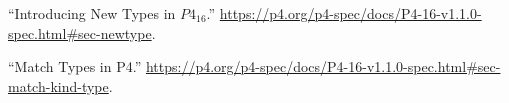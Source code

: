 \documentclass[11pt]{article}
\begin{document}
{{\begin{thebibliography}{36}
\mdbibitemlabel{{}[11]}\textquotedblleft{}Introducing New Types in $P4_{16}$.\textquotedblright{} \href{https://p4.org/p4-spec/docs/P4-16-v1.1.0-spec.html\%23sec-newtype}{{\ttfamily https://\hspace{0pt}p4.\hspace{0pt}org/\hspace{0pt}p4-\hspace{0pt}spec/\hspace{0pt}docs/\hspace{0pt}P4-\hspace{0pt}16-\hspace{0pt}v1.\hspace{0pt}1.\hspace{0pt}0-\hspace{0pt}spec.\hspace{0pt}html\#\hspace{0pt}sec-\hspace{0pt}newtype}}.\label{p4newtypes}%

\mdbibitemlabel{{}[12]}\textquotedblleft{}Match Types in P4.\textquotedblright{} \href{https://p4.org/p4-spec/docs/P4-16-v1.1.0-spec.html\%23sec-match-kind-type}{{\ttfamily https://\hspace{0pt}p4.\hspace{0pt}org/\hspace{0pt}p4-\hspace{0pt}spec/\hspace{0pt}docs/\hspace{0pt}P4-\hspace{0pt}16-\hspace{0pt}v1.\hspace{0pt}1.\hspace{0pt}0-\hspace{0pt}spec.\hspace{0pt}html\#\hspace{0pt}sec-\hspace{0pt}match-\hspace{0pt}kind-\hspace{0pt}type}}.\label{p4matchtypes}%


\end{thebibliography}}}
\end{document}
